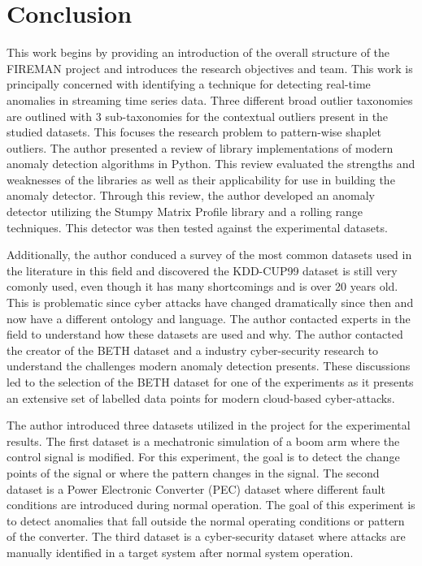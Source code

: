 \section{Conclusion}
\label{sec:conclusion}

This work begins by providing an introduction of the overall structure of the FIREMAN project and introduces the research objectives and team. This work is principally concerned with identifying a technique for detecting real-time anomalies in streaming time series data. Three different broad outlier taxonomies are outlined with 3 sub-taxonomies for the contextual outliers present in the studied datasets. This focuses the research problem to pattern-wise shaplet outliers. The author presented a review of library implementations of modern anomaly detection algorithms in Python. This review evaluated the strengths and weaknesses of the libraries as well as their applicability for use in building the anomaly detector. Through this review, the author developed an anomaly detector utilizing the Stumpy Matrix Profile library and a rolling range techniques. This detector was then tested against the experimental datasets. 

Additionally, the author conduced a survey of the most common datasets used in the literature in this field and discovered the KDD-CUP99 dataset is still very comonly used, even though it has many shortcomings and is over 20 years old. This is problematic since cyber attacks have changed dramatically since then and now have a different ontology and language. The author contacted experts in the field to understand how these datasets are used and why. The author contacted the creator of the BETH dataset and a industry cyber-security research to understand the challenges modern anomaly detection presents. These discussions led to the selection of the BETH dataset for one of the experiments as it presents an extensive set of labelled data points for modern cloud-based cyber-attacks.

The author introduced three datasets utilized in the project for the experimental results. The first dataset is a mechatronic simulation of a boom arm where the control signal is modified. For this experiment, the goal is to detect the change points of the signal or where the pattern changes in the signal. The second dataset is a Power Electronic Converter (PEC) dataset where different fault conditions are introduced during normal operation. The goal of this experiment is to detect anomalies that fall outside the normal operating conditions or pattern of the converter. The third dataset is a cyber-security dataset where attacks are manually identified in a target system after normal system operation.

